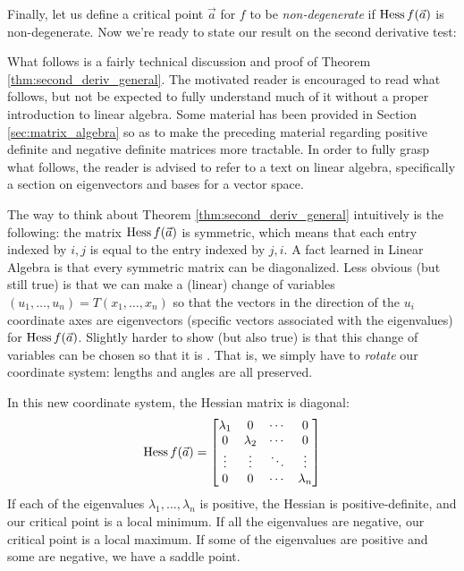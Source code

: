 Finally, let us define a critical point $\vec{a}$ for $f$ to be {\em non-degenerate} if $\operatorname{Hess} f(\vec{a})$ is non-degenerate.  Now we're ready to state our result on the second derivative test:

What follows is a fairly technical discussion and proof of Theorem \ref{thm:second_deriv_general}.  The motivated reader is encouraged to read what follows, but not be expected to fully understand much of it without a proper introduction to linear algebra.  Some material has been provided in Section \ref{sec:matrix_algebra} so as to make the preceding material regarding positive definite and negative definite matrices more tractable.  In order to fully grasp what follows, the reader is advised to refer to a text on linear algebra, specifically a section on eigenvectors and bases for a vector space.  

 
The way to think about Theorem \ref{thm:second_deriv_general} intuitively is the following: the matrix $\operatorname{Hess} f(\vec{a})$ is symmetric, which means that each entry indexed by $i,j$ is equal to the entry indexed by $j,i$. A fact learned in Linear Algebra is that every symmetric matrix can be diagonalized. Less obvious (but still true) is that we can make a (linear) change of variables $(u_1,\ldots, u_n) = T(x_1,\ldots, x_n)$ so that the vectors in the direction of the $u_i$ coordinate axes are eigenvectors (specific vectors associated with the eigenvalues) for $\operatorname{Hess} f(\vec{a})$. Slightly harder to show (but also true) is that this change of variables can be chosen so that it is . That is, we simply have to \emph{rotate} our coordinate system: lengths and angles are all preserved.

In this new coordinate system, the Hessian matrix is diagonal:
\[
\operatorname{Hess} f(\vec{a}) = \begin{bmatrix} \lambda_1 & 0 & \cdots & 0\\
								  0 & \lambda_2 & \cdots & 0\\
								  \vdots & \vdots & \ddots & \vdots\\
								  0 & 0 & \cdots & \lambda_n\end{bmatrix}
\]
If each of the eigenvalues $\lambda_1,\ldots, \lambda_n$ is positive, the Hessian is positive-definite, and our critical point is a local minimum. If all the eigenvalues are negative, our critical point is a local maximum. If some of the eigenvalues are positive and some are negative, we have a saddle point.

